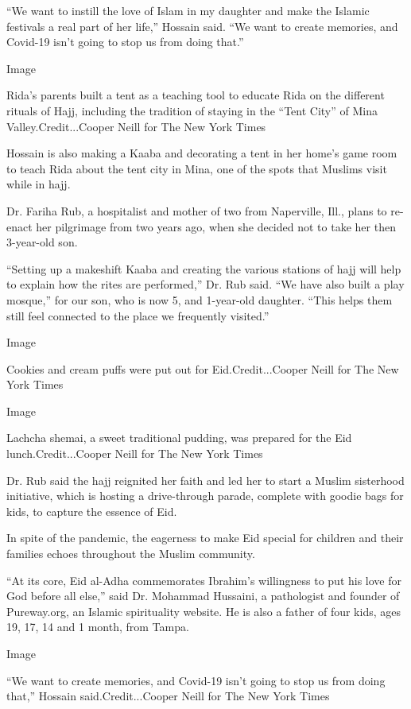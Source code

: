 ``We want to instill the love of Islam in my daughter and make the
Islamic festivals a real part of her life,'' Hossain said. ``We want to
create memories, and Covid-19 isn't going to stop us from doing that.''

Image

Rida's parents built a tent as a teaching tool to educate Rida on the
different rituals of Hajj, including the tradition of staying in the
``Tent City'' of Mina Valley.Credit...Cooper Neill for The New York
Times

Hossain is also making a Kaaba and decorating a tent in her home's game
room to teach Rida about the tent city in Mina, one of the spots that
Muslims visit while in hajj.

Dr. Fariha Rub, a hospitalist and mother of two from Naperville, Ill.,
plans to re-enact her pilgrimage from two years ago, when she decided
not to take her then 3-year-old son.

``Setting up a makeshift Kaaba and creating the various stations of hajj
will help to explain how the rites are performed,'' Dr. Rub said. ``We
have also built a play mosque,'' for our son, who is now 5, and
1-year-old daughter. ``This helps them still feel connected to the place
we frequently visited.''

Image

Cookies and cream puffs were put out for Eid.Credit...Cooper Neill for
The New York Times

Image

Lachcha shemai, a sweet traditional pudding, was prepared for the Eid
lunch.Credit...Cooper Neill for The New York Times

Dr. Rub said the hajj reignited her faith and led her to start a Muslim
sisterhood initiative, which is hosting a drive-through parade, complete
with goodie bags for kids, to capture the essence of Eid.

In spite of the pandemic, the eagerness to make Eid special for children
and their families echoes throughout the Muslim community.

``At its core, Eid al-Adha commemorates Ibrahim's willingness to put his
love for God before all else,'' said Dr. Mohammad Hussaini, a
pathologist and founder of Pureway.org, an Islamic spirituality website.
He is also a father of four kids, ages 19, 17, 14 and 1 month, from
Tampa.

Image

``We want to create memories, and Covid-19 isn't going to stop us from
doing that,'' Hossain said.Credit...Cooper Neill for The New York Times


